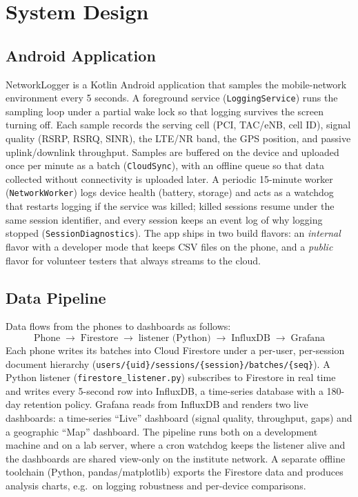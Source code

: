 
\section{System Design}

\subsection{Android Application}
NetworkLogger is a Kotlin Android application that samples the mobile-network
environment every 5 seconds. A foreground service (\texttt{LoggingService})
runs the sampling loop under a partial wake lock so that logging survives the
screen turning off. Each sample records the serving cell (PCI, TAC/eNB, cell
ID), signal quality (RSRP, RSRQ, SINR), the LTE/NR band, the GPS position, and
passive uplink/downlink throughput. Samples are buffered on the device and
uploaded once per minute as a batch (\texttt{CloudSync}), with an offline queue
so that data collected without connectivity is uploaded later. A periodic
15-minute worker (\texttt{NetworkWorker}) logs device health (battery, storage)
and acts as a watchdog that restarts logging if the service was killed; killed
sessions resume under the same session identifier, and every session keeps an
event log of why logging stopped (\texttt{SessionDiagnostics}). The app ships
in two build flavors: an \emph{internal} flavor with a developer mode that
keeps CSV files on the phone, and a \emph{public} flavor for volunteer testers
that always streams to the cloud.

\subsection{Data Pipeline}
Data flows from the phones to dashboards as follows:
\[
\text{Phone} \;\rightarrow\; \text{Firestore} \;\rightarrow\;
\text{listener (Python)} \;\rightarrow\; \text{InfluxDB} \;\rightarrow\;
\text{Grafana}
\]
Each phone writes its batches into Cloud Firestore under a per-user,
per-session document hierarchy
(\texttt{users/\{uid\}/sessions/\{session\}/batches/\{seq\}}). A Python
listener (\texttt{firestore\_listener.py}) subscribes to Firestore in real
time and writes every 5-second row into InfluxDB, a time-series database with
a 180-day retention policy. Grafana reads from InfluxDB and renders two live
dashboards: a time-series ``Live'' dashboard (signal quality, throughput,
gaps) and a geographic ``Map'' dashboard. The pipeline runs both on a
development machine and on a lab server, where a cron watchdog keeps the
listener alive and the dashboards are shared view-only on the institute
network. A separate offline toolchain (Python, pandas/matplotlib) exports the
Firestore data and produces analysis charts, e.g.\ on logging robustness and
per-device comparisons.

